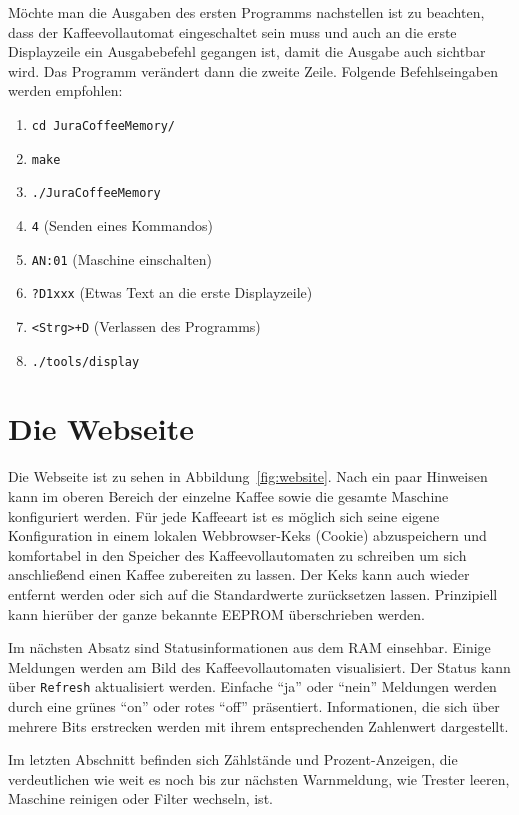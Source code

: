 Möchte man die Ausgaben des ersten Programms nachstellen ist zu beachten, dass der Kaffeevollautomat eingeschaltet sein muss und auch an die erste Displayzeile ein Ausgabebefehl gegangen ist, damit die Ausgabe auch sichtbar wird.
Das Programm verändert dann die zweite Zeile.
Folgende Befehlseingaben werden empfohlen:
\begin{enumerate}
  \item \texttt{cd JuraCoffeeMemory/}
  \item \texttt{make}
  \item \texttt{./JuraCoffeeMemory}
  \item \texttt{4} (Senden eines Kommandos)
  \item \texttt{AN:01} (Maschine einschalten)
  \item \texttt{?D1xxx} (Etwas Text an die erste Displayzeile)
  \item \texttt{<Strg>+D} (Verlassen des Programms)
  \item \texttt{./tools/display}
\end{enumerate}

\section{Die Webseite}

Die Webseite ist zu sehen in Abbildung~\ref{fig:website}.
Nach ein paar Hinweisen kann im oberen Bereich der einzelne Kaffee sowie die gesamte Maschine konfiguriert werden.
Für jede Kaffeeart ist es möglich sich seine eigene Konfiguration in einem lokalen Webbrowser-Keks (Cookie) abzuspeichern und komfortabel in den Speicher des Kaffeevollautomaten zu schreiben um sich anschließend einen Kaffee zubereiten zu lassen.
Der Keks kann auch wieder entfernt werden oder sich auf die Standardwerte zurücksetzen lassen.
Prinzipiell kann hierüber der ganze bekannte \ac{EEPROM} überschrieben werden.

Im nächsten Absatz sind Statusinformationen aus dem \ac{RAM} einsehbar.
Einige Meldungen werden am Bild des Kaffeevollautomaten visualisiert.
Der Status kann über \texttt{Refresh} aktualisiert werden.
Einfache "`ja"' oder "`nein"' Meldungen werden durch eine grünes "`on"' oder rotes "`off"' präsentiert.
Informationen, die sich über mehrere Bits erstrecken werden mit ihrem entsprechenden Zahlenwert dargestellt.

Im letzten Abschnitt befinden sich Zählstände und Prozent-Anzeigen, die verdeutlichen wie weit es noch bis zur nächsten Warnmeldung, wie Trester leeren, Maschine reinigen oder Filter wechseln, ist.

